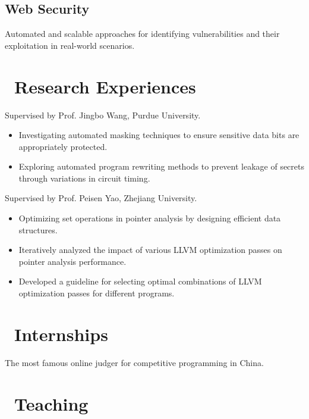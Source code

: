 \documentclass{resume}
\begin{document}
\subsection{\textbf{Web Security}}
Automated and scalable approaches for identifying vulnerabilities and their exploitation in real-world scenarios.

\section{\faSearch\ Research Experiences}
Supervised by Prof. Jingbo Wang, Purdue University.  
\begin{itemize}  
  \item Investigating automated masking techniques to ensure sensitive data bits are appropriately protected.  
  \item Exploring automated program rewriting methods to prevent leakage of secrets through variations in circuit timing.  
\end{itemize}

Supervised by Prof. Peisen Yao, Zhejiang University.  
\begin{itemize}  
  \item Optimizing set operations in pointer analysis by designing efficient data structures.  
  \item Iteratively analyzed the impact of various LLVM optimization passes on pointer analysis performance.  
  \item Developed a guideline for selecting optimal combinations of LLVM optimization passes for different programs.  
\end{itemize}

\section{\faUsers\ Internships}
The most famous online judger for competitive programming in China.

\section{\faBook\ Teaching}
\end{document}
